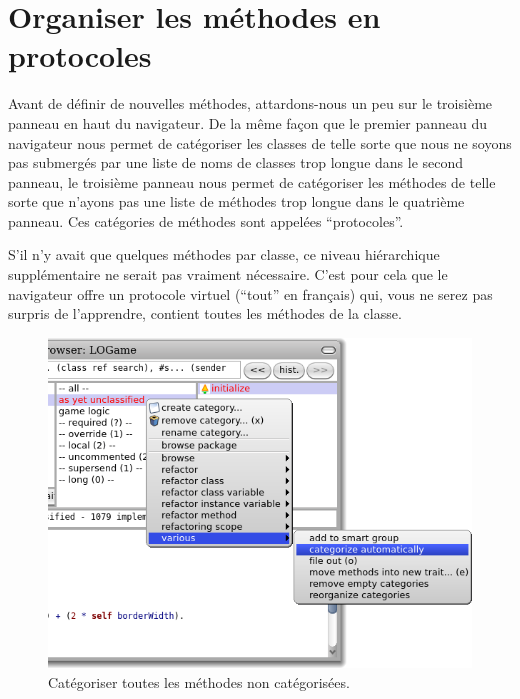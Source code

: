 \documentclass[a4paper,10pt,twoside]{book}
\begin{document}

\section{Organiser les méthodes en protocoles}

Avant de définir de nouvelles méthodes, attardons-nous un peu sur le troisième panneau en haut du navigateur.
De la m\^eme façon que le premier panneau du navigateur nous permet de
catégoriser les classes  de telle sorte
que nous ne soyons pas submergés par une liste de noms de classes trop
longue dans le second panneau, le troisième panneau nous permet de
catégoriser les méthodes de telle sorte que n'ayons pas une liste de
méthodes trop longue dans le quatrième panneau.
Ces catégories de méthodes sont appelées ``protocoles''.

S'il n'y avait que quelques méthodes par classe, ce niveau hiérarchique supplémentaire ne serait pas vraiment nécessaire.
C'est pour cela que le navigateur offre un protocole virtuel
 (\cad ``tout'' en fran\c{c}ais) qui, vous ne serez pas surpris de l'apprendre, contient toutes les méthodes de la classe.

\begin{figure}[htbp]
   \centering
   \includegraphics[width=\textwidth]{Categorize} 
   \caption{Catégoriser  toutes les méthodes
     non catégorisées.}
\end{figure}
\end{document}
